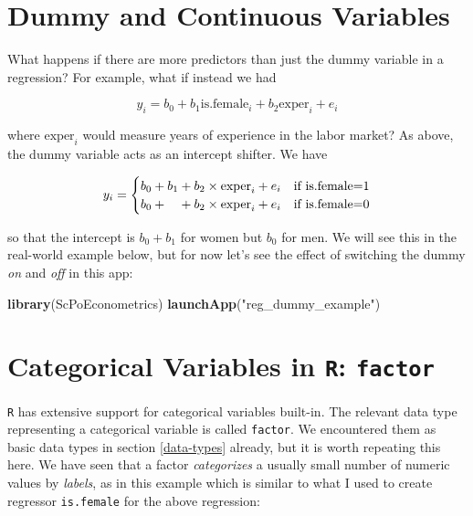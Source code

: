\documentclass[]{book}
\newenvironment{Shaded}{\begin{snugshade}}{\end{snugshade}}
\newcommand{\KeywordTok}[1]{\textcolor[rgb]{0.13,0.29,0.53}{\textbf{#1}}}
\newcommand{\NormalTok}[1]{#1}
\newcommand{\StringTok}[1]{\textcolor[rgb]{0.31,0.60,0.02}{#1}}
\begin{document}
\hypertarget{dummy-and-continuous-variables}{%
\section{Dummy and Continuous Variables}\label{dummy-and-continuous-variables}}

What happens if there are more predictors than just the dummy variable in a regression? For example, what if instead we had

\begin{equation}
y_i = b_0 + b_1 \text{is.female}_i + b_2 \text{exper}_i + e_i \label{eq:dummy-reg2}
\end{equation}

where \(\text{exper}_i\) would measure years of experience in the labor market? As above, the dummy variable acts as an intercept shifter. We have

\begin{equation}
y_i =  \begin{cases}
b_0 + b_1 + b_2 \times \text{exper}_i + e_i & \text{if is.female=1} \\
b_0  + \hphantom{b_1} +b_2 \times \text{exper}_i + e_i & \text{if is.female=0}
\end{cases}
\end{equation}

so that the intercept is \(b_0 + b_1\) for women but \(b_0\) for men. We will see this in the real-world example below, but for now let's see the effect of switching the dummy \emph{on} and \emph{off} in this app:

\begin{Shaded}
\begin{Highlighting}[]
\KeywordTok{library}\NormalTok{(ScPoEconometrics)}
\KeywordTok{launchApp}\NormalTok{(}\StringTok{"reg_dummy_example"}\NormalTok{)}
\end{Highlighting}
\end{Shaded}

\hypertarget{categorical-variables-in-r-factor}{%
\section{\texorpdfstring{Categorical Variables in \texttt{R}: \texttt{factor}}{Categorical Variables in R: factor}}\label{categorical-variables-in-r-factor}}

\texttt{R} has extensive support for categorical variables built-in. The relevant data type representing a categorical variable is called \texttt{factor}. We encountered them as basic data types in section \ref{data-types} already, but it is worth repeating this here. We have seen that a factor \emph{categorizes} a usually small number of numeric values by \emph{labels}, as in this example which is similar to what I used to create regressor \texttt{is.female} for the above regression:
\end{document}
